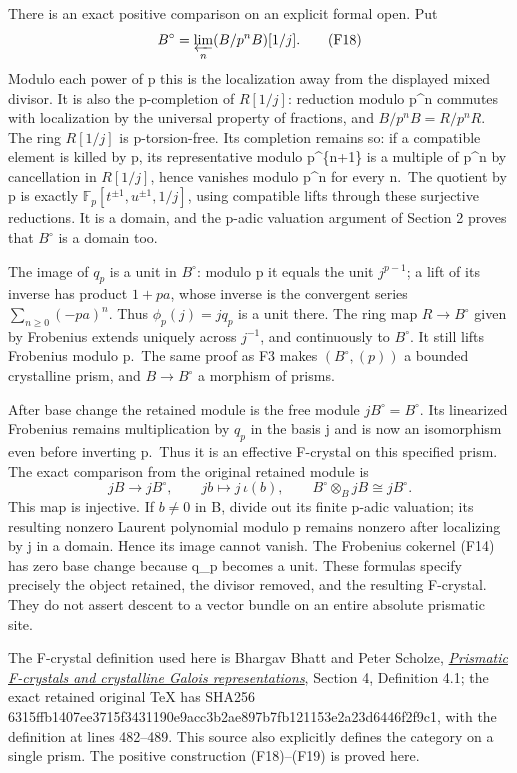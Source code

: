 \documentclass[
]{article}
\begin{document}
There is an exact positive comparison on an explicit formal open. Put \[
B^{\circ}=\varprojlim_n (B/p^nB)[1/j].
\tag{F18}
\] Modulo each power of p this is the localization away from the
displayed mixed divisor. It is also the p-completion of \(R[1/j]\):
reduction modulo p\^{}n commutes with localization by the universal
property of fractions, and \(B/p^nB=R/p^nR\). The ring \(R[1/j]\) is
p-torsion-free. Its completion remains so: if a compatible element is
killed by p, its representative modulo p\^{}\{n+1\} is a multiple of
p\^{}n by cancellation in \(R[1/j]\), hence vanishes modulo p\^{}n for
every n.~The quotient by p is exactly
\(\mathbb F_p[t^{\pm1},u^{\pm1},1/j]\), using compatible lifts through
these surjective reductions. It is a domain, and the p-adic valuation
argument of Section 2 proves that \(B^\circ\) is a domain too.

The image of \(q_p\) is a unit in \(B^\circ\): modulo p it equals the
unit \(j^{p-1}\); a lift of its inverse has product \(1+pa\), whose
inverse is the convergent series \(\sum_{n\ge0}(-pa)^n\). Thus
\(\phi_p(j)=jq_p\) is a unit there. The ring map \(R\to B^\circ\) given
by Frobenius extends uniquely across \(j^{-1}\), and continuously to
\(B^\circ\). It still lifts Frobenius modulo p.~The same proof as F3
makes \((B^\circ,(p))\) a bounded crystalline prism, and
\(B\to B^\circ\) a morphism of prisms.

After base change the retained module is the free module
\(jB^\circ=B^\circ\). Its linearized Frobenius remains multiplication by
\(q_p\) in the basis j and is now an isomorphism even before inverting
p.~Thus it is an effective F-crystal on this specified prism. The exact
comparison from the original retained module is \[
jB\longrightarrow jB^\circ,\qquad jb\longmapsto j\,\iota(b),
\qquad
B^\circ\otimes_{B}jB\cong jB^\circ.
\tag{F19}
\] This map is injective. If \(b\ne0\) in B, divide out its finite
p-adic valuation; its resulting nonzero Laurent polynomial modulo p
remains nonzero after localizing by j in a domain. Hence its image
cannot vanish. The Frobenius cokernel (F14) has zero base change because
q\_p becomes a unit. These formulas specify precisely the object
retained, the divisor removed, and the resulting F-crystal. They do not
assert descent to a vector bundle on an entire absolute prismatic site.

The F-crystal definition used here is Bhargav Bhatt and Peter Scholze,
\href{https://arxiv.org/abs/2106.14735}{\emph{Prismatic F-crystals and
crystalline Galois representations}}, Section 4, Definition 4.1; the
exact retained original TeX has SHA256
6315ffb1407ee3715f3431190e9acc3b2ae897b7fb121153e2a23d6446f2f9c1, with
the definition at lines 482--489. This source also explicitly defines
the category on a single prism. The positive construction (F18)--(F19)
is proved here.
\end{document}
